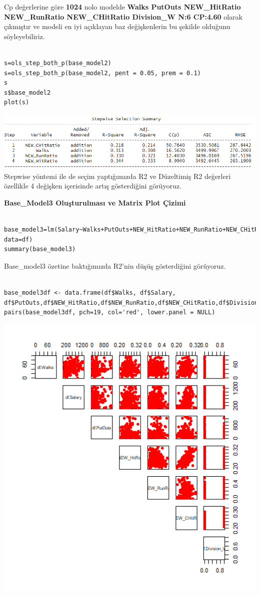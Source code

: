 \documentclass[
]{article}
\begin{document}
Cp değerlerine göre \textbf{1024} nolo modelde \textbf{Walks PutOuts
NEW\_HitRatio NEW\_RunRatio NEW\_CHitRatio Division\_W N:6 CP:4.60}
olarak çıkmıştır ve modeli en iyi açıklayan baz değişkenlerin bu şekilde
olduğunu söyleyebiliriz.

\begin{verbatim}

s=ols_step_both_p(base_model2)
s=ols_step_both_p(base_model2, pent = 0.05, prem = 0.1)
s
s$base_model2
plot(s)
\end{verbatim}

\includegraphics{Picture3.png}Stepwise yöntemi ile de seçim yaptığımızda
R2 ve Düzeltimiş R2 değerleri özellikle 4 değişken içerisinde artış
gösterdiğini görüyoruz.

\textbf{Base\_Model3 Oluşturulması ve Matrix Plot Çizimi}

\begin{verbatim}

base_model3=lm(Salary~Walks+PutOuts+NEW_HitRatio+NEW_RunRatio+NEW_CHitRatio+Division_W, data=df)
summary(base_model3)
\end{verbatim}

Base\_model3 özetine baktığımızda R2'nin düşüş gösterdiğini görüyoruz.

\begin{verbatim}

base_model3df <- data.frame(df$Walks, df$Salary, df$PutOuts,df$NEW_HitRatio,df$NEW_RunRatio,df$NEW_CHitRatio,df$Division_W)
pairs(base_model3df, pch=19, col='red', lower.panel = NULL)
\end{verbatim}

\includegraphics[width=6.89583in,height=\textheight]{Rplot.png}
\end{document}
